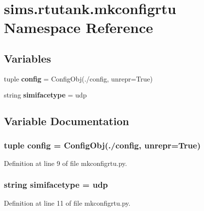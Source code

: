 \section{sims.\+rtutank.\+mkconfigrtu Namespace Reference}
\label{namespacesims_1_1rtutank_1_1mkconfigrtu}
\subsection*{Variables}
\begin{DoxyCompactItemize}
\item 
tuple {\bf config} = Config\+Obj(\textquotesingle{}./config\textquotesingle{}, unrepr=True)
\item 
string {\bf simifacetype} = \textquotesingle{}udp\textquotesingle{}
\end{DoxyCompactItemize}


\subsection{Variable Documentation}
\subsubsection[{config}]{\setlength{\rightskip}{0pt plus 5cm}tuple config = Config\+Obj(\textquotesingle{}./config\textquotesingle{}, unrepr=True)}\label{namespacesims_1_1rtutank_1_1mkconfigrtu_ad5f91786d7c873886a576621a2c1b0b5}


Definition at line 9 of file mkconfigrtu.\+py.

\subsubsection[{simifacetype}]{\setlength{\rightskip}{0pt plus 5cm}string simifacetype = \textquotesingle{}udp\textquotesingle{}}\label{namespacesims_1_1rtutank_1_1mkconfigrtu_a7f5f5e89422cd15dfc1af6d7593d69c7}


Definition at line 11 of file mkconfigrtu.\+py.

